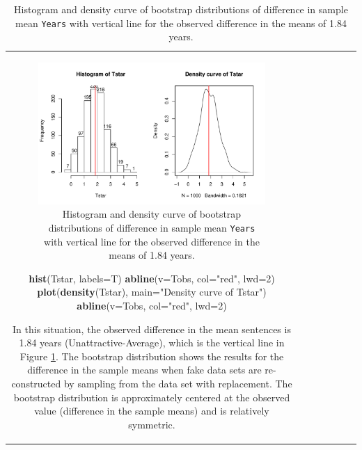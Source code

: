 \documentclass[]{book}
\newenvironment{Shaded}{\begin{snugshade}}{\end{snugshade}}
\newcommand{\KeywordTok}[1]{\textcolor[rgb]{0.13,0.29,0.53}{\textbf{#1}}}
\newcommand{\DataTypeTok}[1]{\textcolor[rgb]{0.13,0.29,0.53}{#1}}
\newcommand{\DecValTok}[1]{\textcolor[rgb]{0.00,0.00,0.81}{#1}}
\newcommand{\StringTok}[1]{\textcolor[rgb]{0.31,0.60,0.02}{#1}}
\newcommand{\NormalTok}[1]{#1}
\theoremstyle{definition}
\theoremstyle{definition}
\theoremstyle{remark}
\begin{document}
\begin{longtable}[]{@{}ccccccc@{}}
\begin{minipage}[b]{0.10\columnwidth}
\begin{Shaded}
\begin{Highlighting}[]
\begin{Shaded}
\begin{Highlighting}[]
\begin{enumerate}
\begin{figure}
\centering
\includegraphics{02-reintroductionToStatistics_files/figure-latex/Figure2-18-1.pdf}
\caption{\label{fig:Figure2-18}Histogram and density curve of bootstrap distributions of
difference in sample mean \texttt{Years} with vertical line for the
observed difference in the means of 1.84 years.}
\end{figure}

\begin{Shaded}
\begin{Highlighting}[]
\KeywordTok{hist}\NormalTok{(Tstar, }\DataTypeTok{labels=}\NormalTok{T)}
\KeywordTok{abline}\NormalTok{(}\DataTypeTok{v=}\NormalTok{Tobs, }\DataTypeTok{col=}\StringTok{"red"}\NormalTok{, }\DataTypeTok{lwd=}\DecValTok{2}\NormalTok{)}
\KeywordTok{plot}\NormalTok{(}\KeywordTok{density}\NormalTok{(Tstar), }\DataTypeTok{main=}\StringTok{"Density curve of Tstar"}\NormalTok{)}
\KeywordTok{abline}\NormalTok{(}\DataTypeTok{v=}\NormalTok{Tobs, }\DataTypeTok{col=}\StringTok{"red"}\NormalTok{, }\DataTypeTok{lwd=}\DecValTok{2}\NormalTok{)}
\end{Highlighting}
\end{Shaded}

In this situation, the observed difference in the mean sentences is 1.84
years (Unattractive-Average), which is the vertical line in Figure
\ref{fig:Figure2-18}. The bootstrap distribution shows the results for
the difference in the sample means when fake data sets are
re-constructed by sampling from the data set with replacement. The
bootstrap distribution is approximately centered at the observed value
(difference in the sample means) and is relatively symmetric.


\end{enumerate}
\end{Highlighting}
\end{Shaded}
\end{Highlighting}
\end{Shaded}
\end{minipage}
\end{longtable}
\end{document}
